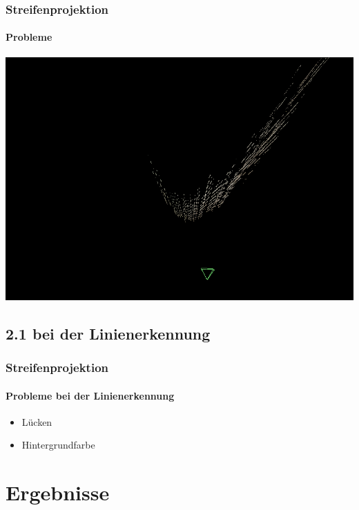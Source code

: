 \documentclass{beamer}
\begin{document}
\begin{frame}
	\frametitle{Streifenprojektion}
	\framesubtitle{Probleme}

	\includegraphics[width=\linewidth]{includes/krumm.png}

\end{frame}

\subsection{2.1 \hspace{5px} bei der Linienerkennung}
\begin{frame}
	\frametitle{Streifenprojektion}
	\framesubtitle{Probleme bei der Linienerkennung}

	\begin{itemize}
		\item Lücken
		\item Hintergrundfarbe
	\end{itemize}

\end{frame}

\section{Ergebnisse}
\end{document}
